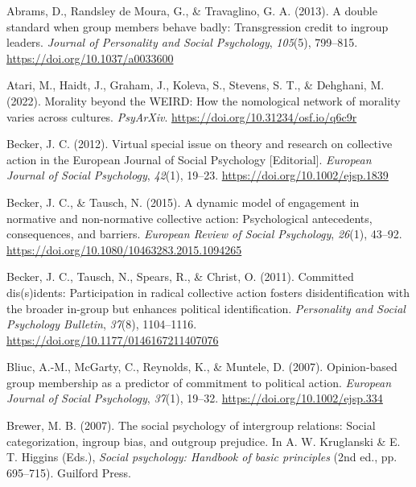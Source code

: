 \documentclass[twocolumn, 11pt, letterpaper]{article}
\newenvironment{CSLReferences}[2]{}{}
\begin{document}
\hypertarget{refs}{}
\begin{CSLReferences}{1}{0}
\leavevmode{}%
Abrams, D., Randsley de Moura, G., \& Travaglino, G. A. (2013). A double
standard when group members behave badly: {Transgression} credit to
ingroup leaders. \emph{Journal of Personality and Social Psychology},
\emph{105}(5), 799--815. \url{https://doi.org/10.1037/a0033600}

\leavevmode{}%
Atari, M., Haidt, J., Graham, J., Koleva, S., Stevens, S. T., \&
Dehghani, M. (2022). Morality beyond the {WEIRD}: How the nomological
network of morality varies across cultures. \emph{PsyArXiv}.
\url{https://doi.org/10.31234/osf.io/q6c9r}

\leavevmode{}%
Becker, J. C. (2012). Virtual special issue on theory and research on
collective action in the {European} {Journal} of {Social} {Psychology}
{[}{Editorial}{]}. \emph{European Journal of Social Psychology},
\emph{42}(1), 19--23. \url{https://doi.org/10.1002/ejsp.1839}

\leavevmode{}%
Becker, J. C., \& Tausch, N. (2015). A dynamic model of engagement in
normative and non-normative collective action: {Psychological}
antecedents, consequences, and barriers. \emph{European Review of Social
Psychology}, \emph{26}(1), 43--92.
\url{https://doi.org/10.1080/10463283.2015.1094265}

\leavevmode{}%
Becker, J. C., Tausch, N., Spears, R., \& Christ, O. (2011). Committed
dis(s)idents: {Participation} in radical collective action fosters
disidentification with the broader in-group but enhances political
identification. \emph{Personality and Social Psychology Bulletin},
\emph{37}(8), 1104--1116. \url{https://doi.org/10.1177/0146167211407076}

\leavevmode{}%
Bliuc, A.-M., McGarty, C., Reynolds, K., \& Muntele, D. (2007).
Opinion-based group membership as a predictor of commitment to political
action. \emph{European Journal of Social Psychology}, \emph{37}(1),
19--32. \url{https://doi.org/10.1002/ejsp.334}

\leavevmode{}%
Brewer, M. B. (2007). The social psychology of intergroup relations:
Social categorization, ingroup bias, and outgroup prejudice. In A. W.
Kruglanski \& E. T. Higgins (Eds.), \emph{Social psychology: Handbook of
basic principles} (2nd ed., pp. 695--715). Guilford Press.


\end{CSLReferences}
\end{document}
